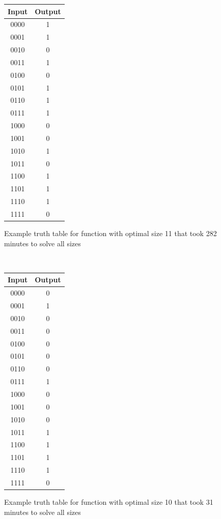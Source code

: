 \documentclass{article}
\begin{document}
\begin{figure}[!h]
\begin{minipage}{0.45\textwidth}
\end{minipage}\hfill
\begin{minipage}{0.45\textwidth}
  \begin{centering}
    \begin{tabular}{ |c|c| }
    \hline
    Input & Output \\ 
    \hline
    0000 & 1 \\
    0001 & 1 \\
    0010 & 0 \\
    0011 & 1 \\
    0100 & 0 \\
    0101 & 1 \\
    0110 & 1 \\
    0111 & 1 \\
    1000 & 0 \\
    1001 & 0 \\
    1010 & 1 \\
    1011 & 0 \\
    1100 & 1 \\
    1101 & 1 \\
    1110 & 1 \\
    1111 & 0 \\ 
    \hline
    \end{tabular}
    \end{centering}
    \caption{Example truth table for function with optimal size 11 that took 282 minutes to solve all sizes}

    \
    
    \begin{centering}
      \begin{tabular}{ |c|c| }
      \hline
      Input & Output \\ 
      \hline
      0000 & 0 \\
      0001 & 1 \\
      0010 & 0 \\
      0011 & 0 \\
      0100 & 0 \\
      0101 & 0 \\
      0110 & 0 \\
      0111 & 1 \\
      1000 & 0 \\
      1001 & 0 \\
      1010 & 0 \\
      1011 & 1 \\
      1100 & 1 \\
      1101 & 1 \\
      1110 & 1 \\
      1111 & 0 \\
      \hline
      \end{tabular}
      \end{centering}
      \caption{Example truth table for function with optimal size 10 that took 31 minutes to solve all sizes}
  \end{minipage}
\end{figure}
\end{document}
